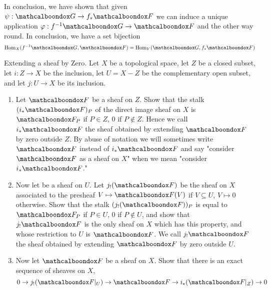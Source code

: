 \begin{sol}
	In conclusion, we have shown that given $\psi: \sG \to f_* \sF$ we can induce a unique application $\varphi: f^{-1}\sG \to \sF$ and the other way round. In conclusion, we have a set bijection 
	\[
		\mathrm{Hom}_X(f^{-1}\sG, \sF) = \mathrm{Hom}_Y(\sG, f_{*}\sF)
	\]

\end{sol}

\begin{ex}
	Extending a sheaf by Zero. Let $X$ be a topological space, let $Z$ be a closed subset, let $i: Z \to X$ be the inclusion, let $U = X-Z$ be the complementary open subset, and let $j: U \to X$ be its inclusion.

	\begin{enumerate}[label=\alph*)]
		\item Let $\sF$ be a sheaf on $Z$. Show that the stalk $(i_{*} \sF)_P$ of the direct image sheaf on $X$ is $\sF_P$ if $P \in Z$, 0 if $P \notin Z$. Hence we call $i_{*} \sF$ the sheaf obtained by extending $\sF$ by zero outside $Z$. By abuse of notation we will sometimes write $\sF$ instead of $i_{*}\sF$ and say "consider $\sF$ as a sheaf on $X$" when we mean "consider $i_{*} \sF$."

		\item Now let \sF be a sheaf on $U$. Let $j_{!}(\sF)$ be the sheaf on $X$ associated to the presheaf $V \mapsto \sF(V)$ if $V \subseteq U$, $V \mapsto 0$ otherwise. Show that the stalk $(j_{!}(\sF))_P$ is equal to $\sF_P$ if $P \in U$, 0 if $P \notin U$, and show that $j_{!}\sF$ is the only sheaf on $X$ which has this property, and whose restriction to $U$ is $\sF$. We call $j_{!}\sF$ the sheaf obtained by extending $\sF$ by zero outside $U$.

		\item Now let $\sF$ be a sheaf on $X$. Show that there is an exact sequence of sheaves on $X$,
		\[
			0 \to j_{!}(\sF|_{U}) \to \sF \to i_{*}(\sF|_{Z}) \to 0
		\]
	\end{enumerate}
\end{ex}

